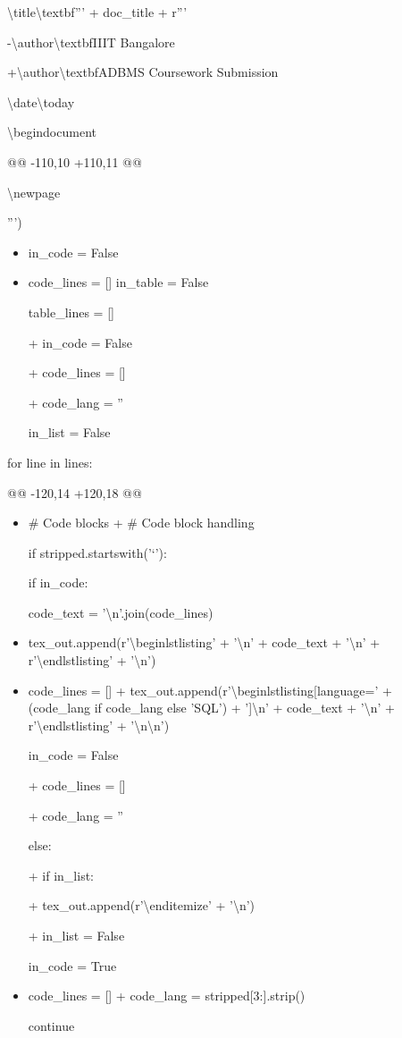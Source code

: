 \documentclass[11pt,a4paper]{article}
\begin{document}
\textbackslash{}title{\textbackslash{}textbf{''' + doc\_title + r'''}}

-\textbackslash{}author{\textbackslash{}textbf{IIIT Bangalore}}

+\textbackslash{}author{\textbackslash{}textbf{ADBMS Coursework Submission}}

\textbackslash{}date{\textbackslash{}today}


\textbackslash{}begin{document}

@@ -110,10 +110,11 @@

\textbackslash{}newpage

''')


\begin{itemize}
\item    in\_code = False
\item    code\_lines = []
in\_table = False

table\_lines = []

+    in\_code = False

+    code\_lines = []

+    code\_lang = ''

in\_list = False

\end{itemize}

for line in lines:

@@ -120,14 +120,18 @@


\begin{itemize}
\item        \# Code blocks
+        \# Code block handling

if stripped.startswith('\texttt{}`'):

if in\_code:

code\_text = '\textbackslash{}n'.join(code\_lines)

\item                tex\_out.append(r'\textbackslash{}begin{lstlisting}' + '\textbackslash{}n' + code\_text + '\textbackslash{}n' + r'\textbackslash{}end{lstlisting}' + '\textbackslash{}n')
\item                code\_lines = []
+                tex\_out.append(r'\textbackslash{}begin{lstlisting}[language=' + (code\_lang if code\_lang else 'SQL') + ']\textbackslash{}n' + code\_text + '\textbackslash{}n' + r'\textbackslash{}end{lstlisting}' + '\textbackslash{}n\textbackslash{}n')

in\_code = False

+                code\_lines = []

+                code\_lang = ''

else:

+                if in\_list:

+                    tex\_out.append(r'\textbackslash{}end{itemize}' + '\textbackslash{}n')

+                    in\_list = False

in\_code = True

\item                code\_lines = []
+                code\_lang = stripped[3:].strip()

continue

\end{itemize}
\end{document}
